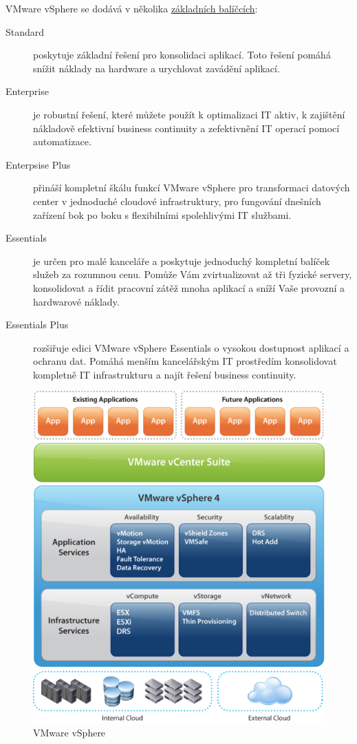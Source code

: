 VMware vSphere se dodává v několika \href{http://www.vmware.com/products/vsphere/compare.html}{základních balíčcích}:
\begin{description}
	\item[Standard] poskytuje základní řešení pro konsolidaci aplikací. Toto řešení pomáhá snížit náklady na hardware a urychlovat zavádění aplikací.\cite{vmware:vSphereOldanyGroup}
	\item[Enterprise] je robustní řešení, které můžete použít k optimalizaci IT aktiv, k zajištění nákladově efektivní business continuity a zefektivnění IT operací pomocí automatizace.\cite{vmware:vSphereOldanyGroup}
	\item[Enterpsise Plus] přináší kompletní škálu funkcí VMware vSphere pro transformaci datových center v jednoduché cloudové infrastruktury, pro fungování dnešních zařízení bok po boku s flexibilními spolehlivými IT službami.\cite{vmware:vSphereOldanyGroup}
	\item[Essentials] je určen pro malé kanceláře a poskytuje jednoduchý kompletní balíček služeb za rozumnou cenu. Pomůže Vám zvirtualizovat až tři fyzické servery, konsolidovat a řídit pracovní zátěž mnoha aplikací a sníží Vaše provozní a hardwarové náklady.\cite{vmware:vSphereOldanyGroup}
	\item[Essentials Plus] rozšiřuje edici VMware vSphere Essentials o vysokou dostupnost aplikací a ochranu dat. Pomáhá menším kancelářským IT prostředím konsolidovat kompletně IT infrastrukturu a najít řešení business continuity.\cite{vmware:vSphereOldanyGroup}
\end{description}

	\begin{figure}[htbp]
		\centering
			\includegraphics[width=1.00\textwidth]{ext/vm_vSphere.png}
		\caption{VMware vSphere\cite{vmware:vSphereOldanyGroupImg}}
		\label{fig:vm_vSphere}
	\end{figure}


